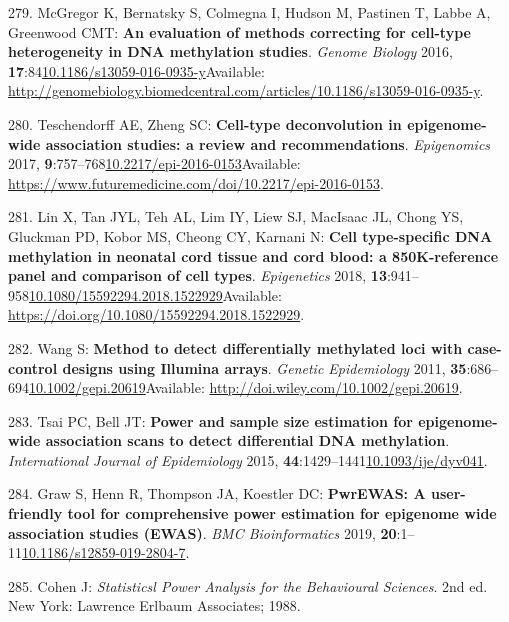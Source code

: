 \documentclass[
]{book}
\begin{document}
\leavevmode\hypertarget{ref-McGregor2016}{}%
279. McGregor K, Bernatsky S, Colmegna I, Hudson M, Pastinen T, Labbe A, Greenwood CMT: \textbf{An evaluation of methods correcting for cell-type heterogeneity in DNA methylation studies}. \emph{Genome Biology} 2016, \textbf{17}:84\href{https://doi.org/10.1186/s13059-016-0935-y}{10.1186/s13059-016-0935-y}Available: \url{http://genomebiology.biomedcentral.com/articles/10.1186/s13059-016-0935-y}.

\leavevmode\hypertarget{ref-Teschendorff2017}{}%
280. Teschendorff AE, Zheng SC: \textbf{Cell-type deconvolution in epigenome-wide association studies: a review and recommendations}. \emph{Epigenomics} 2017, \textbf{9}:757--768\href{https://doi.org/10.2217/epi-2016-0153}{10.2217/epi-2016-0153}Available: \url{https://www.futuremedicine.com/doi/10.2217/epi-2016-0153}.

\leavevmode\hypertarget{ref-Lin2018}{}%
281. Lin X, Tan JYL, Teh AL, Lim IY, Liew SJ, MacIsaac JL, Chong YS, Gluckman PD, Kobor MS, Cheong CY, Karnani N: \textbf{Cell type-specific DNA methylation in neonatal cord tissue and cord blood: a 850K-reference panel and comparison of cell types}. \emph{Epigenetics} 2018, \textbf{13}:941--958\href{https://doi.org/10.1080/15592294.2018.1522929}{10.1080/15592294.2018.1522929}Available: \url{https://doi.org/10.1080/15592294.2018.1522929}.

\leavevmode\hypertarget{ref-Wang2011}{}%
282. Wang S: \textbf{Method to detect differentially methylated loci with case-control designs using Illumina arrays}. \emph{Genetic Epidemiology} 2011, \textbf{35}:686--694\href{https://doi.org/10.1002/gepi.20619}{10.1002/gepi.20619}Available: \url{http://doi.wiley.com/10.1002/gepi.20619}.

\leavevmode\hypertarget{ref-Tsai2015}{}%
283. Tsai PC, Bell JT: \textbf{Power and sample size estimation for epigenome-wide association scans to detect differential DNA methylation}. \emph{International Journal of Epidemiology} 2015, \textbf{44}:1429--1441\href{https://doi.org/10.1093/ije/dyv041}{10.1093/ije/dyv041}.

\leavevmode\hypertarget{ref-Graw2019}{}%
284. Graw S, Henn R, Thompson JA, Koestler DC: \textbf{PwrEWAS: A user-friendly tool for comprehensive power estimation for epigenome wide association studies (EWAS)}. \emph{BMC Bioinformatics} 2019, \textbf{20}:1--11\href{https://doi.org/10.1186/s12859-019-2804-7}{10.1186/s12859-019-2804-7}.

\leavevmode\hypertarget{ref-Cohen1988}{}%
285. Cohen J: \emph{Statisticsl Power Analysis for the Behavioural Sciences}. 2nd ed. New York: Lawrence Erlbaum Associates; 1988.
\end{document}
